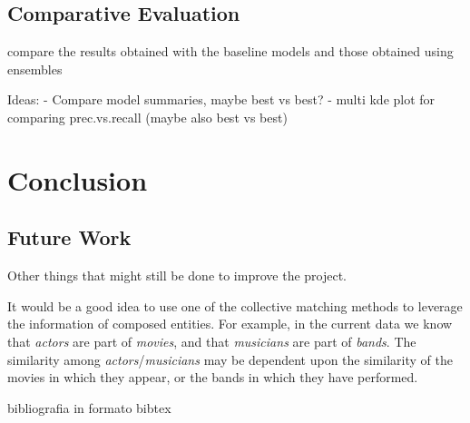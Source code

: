 \documentclass[epsfig,a4paper,11pt,titlepage,twoside,openany]{book}
\begin{document}
\section{Comparative Evaluation}
\label{sec:comparative-evaluation}

compare the results obtained with the baseline models and those obtained using ensembles

Ideas:
    - Compare model summaries, maybe best vs best? 
    - multi kde plot for comparing prec.vs.recall (maybe also best vs best)







\chapter{Conclusion}
\label{chap:conclusion}

\section{Future Work}
\label{sec:future-work}

Other things that might still be done to improve the project.

It would be a good idea to use one of the collective matching methods
\cite{Dong2005_reference_reconciliation,bhattacharya07_collec_entit_resol_relat_data,Kalashnikov2006_collective_graph}
to leverage the information of composed entities. For example, in the current
data we know that \textit{actors} are part of \textit{movies}, and that
\textit{musicians} are part of \textit{bands}. The similarity among
\textit{actors}/\textit{musicians} may be dependent upon the similarity of the
movies in which they appear, or the bands in which they have performed.

\endgroup


bibliografia in formato bibtex
     
\end{document}
